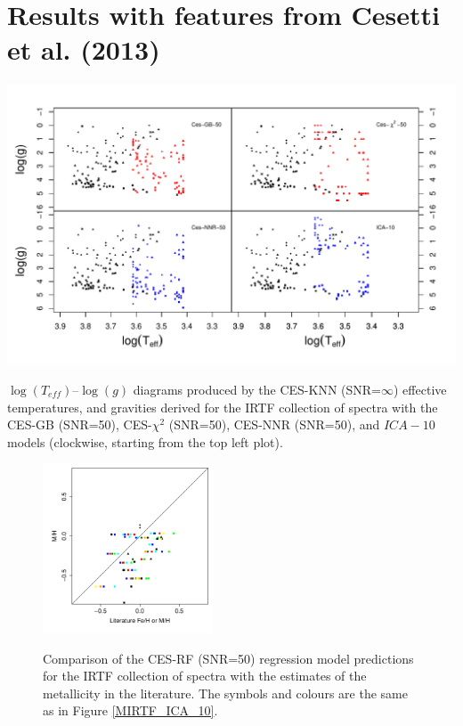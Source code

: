 
  \section{Results with features from Cesetti et al. (2013)}
\label{app:figures:irtf}


\begin {figure*}
 \centering
  \includegraphics[width=\textwidth]{figs/irtf-figs/irtf-Cesseti.pdf}
  \caption{$\log(T_{eff})$--$\log(g)$ diagrams produced by the CES-KNN
    (SNR=$\infty$) effective temperatures, and gravities derived for
    the IRTF collection of spectra with the CES-GB (SNR=50),
    CES-$\chi^2$ (SNR=50), CES-NNR (SNR=50), and $ICA-10$ models
    (clockwise, starting from the top left plot).}
 \label{fig:irtf-ces}
\end {figure*}



\begin {figure}
\centering
\includegraphics[width=0.45\textwidth]{figs/irtf-figs/M-CES.pdf}
\caption{Comparison of the CES-RF (SNR=50) regression model
  predictions for the IRTF collection of spectra with the estimates of
  the metallicity in the literature. The symbols and colours are the
  same as in Figure \ref{MIRTF_ICA_10}.}
\label{fig:irtf-ces-met}
\end {figure}


